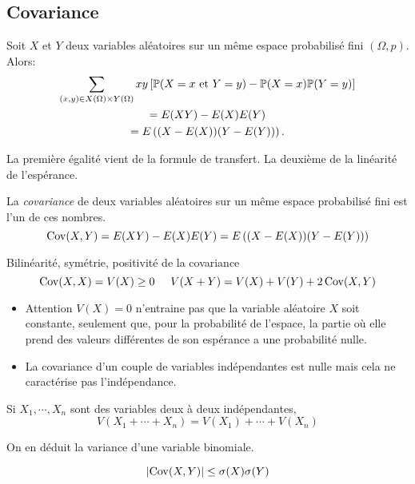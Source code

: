 \subsection{Covariance}
\begin{prop}
 Soit $X$ et $Y$ deux variables aléatoires sur un même espace probabilisé fini $(\Omega,p)$.  Alors:
\begin{multline*}
 \sum_{(x,y)\in X(\Omega)\times Y(\Omega)}xy\left[ \mathbb{P}(X=x \text{ et } Y=y)-\mathbb{P}(X=x)\mathbb{P}(Y=y)\right] \\
= E(XY) - E(X)E(Y)\\
=E\left((X-E(X))(Y-E(Y)) \right). 
\end{multline*}
\end{prop}
\begin{demo}
 La première égalité vient de la formule de transfert. La deuxième de la linéarité de l'espérance.
\end{demo}
\begin{defi}
 La \emph{covariance} de deux variables aléatoires sur un même espace probabilisé fini est l'un de ces nombres.
\begin{displaymath}
 \mathop{\mathrm{Cov}}(X,Y) = E(XY) - E(X)E(Y) = E\left((X-E(X))(Y-E(Y))\right) 
\end{displaymath}
\end{defi}
\newpage
\begin{prop}
 Bilinéarité, symétrie, positivité de la covariance
\begin{displaymath}
 \mathop{\mathrm{Cov}}(X,X) = V(X)\geq 0 \hspace{0.5cm} V(X+Y)=V(X)+V(Y)+2\mathop{\mathrm{Cov}}(X,Y)
\end{displaymath}
\end{prop}
\begin{rems}
 \begin{itemize}
  \item Attention $V(X)=0$ n'entraine pas que la variable aléatoire $X$ soit constante, seulement que, pour la probabilité de l'espace, la partie où elle prend des valeurs différentes de son espérance a une probabilité nulle.
\item La covariance d'un couple de variables indépendantes est nulle mais cela ne caractérise pas l'indépendance.
 \end{itemize}
\end{rems}
\begin{prop}
 Si $X_1,\cdots,X_n$ sont des variables deux à deux indépendantes, 
\begin{displaymath}
 V(X_1+\cdots+X_n) = V(X_1)+\cdots+V(X_n)
\end{displaymath}
\end{prop}
On en déduit la variance d'une variable binomiale.

\begin{prop}
 \begin{displaymath}
  \left|\mathop{\mathrm{Cov}}(X,Y)\right|\leq \sigma(X)\sigma(Y)
 \end{displaymath}
\end{prop}


